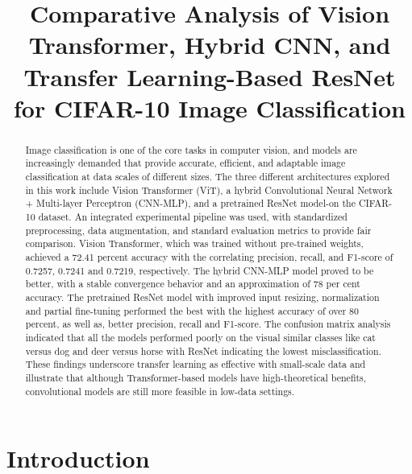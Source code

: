 \documentclass[conference]{IEEEtran}
\begin{document}
\title{Comparative Analysis of Vision Transformer, Hybrid CNN, and Transfer Learning-Based ResNet for CIFAR-10 Image Classification}

\author{

}

\maketitle

\begin{abstract}
Image classification is one of the core tasks in computer vision, and models are increasingly demanded that provide accurate, efficient, and adaptable image classification at data scales of different sizes. The three different architectures explored in this work include Vision Transformer (ViT), a hybrid Convolutional Neural Network + Multi-layer Perceptron (CNN-MLP), and a pretrained ResNet model-on the CIFAR-10 dataset. An integrated experimental pipeline was used, with standardized preprocessing, data augmentation, and standard evaluation metrics to provide fair comparison. Vision Transformer, which was trained without pre-trained weights, achieved a 72.41 percent accuracy with the correlating precision, recall, and F1-score of 0.7257, 0.7241 and 0.7219, respectively. The hybrid CNN-MLP model proved to be better, with a stable convergence behavior and an approximation of 78 per cent accuracy. The pretrained ResNet model with improved input resizing, normalization and partial fine-tuning performed the best with the highest accuracy of over 80 percent, as well as, better precision, recall and F1-score. The confusion matrix analysis indicated that all the models performed poorly on the visual similar classes like cat versus dog and deer versus horse with ResNet indicating the lowest misclassification. These findings underscore transfer learning as effective with small-scale data and illustrate that although Transformer-based models have high-theoretical benefits, convolutional models are still more feasible in low-data settings.
\end{abstract}

\section{Introduction}
\end{document}

